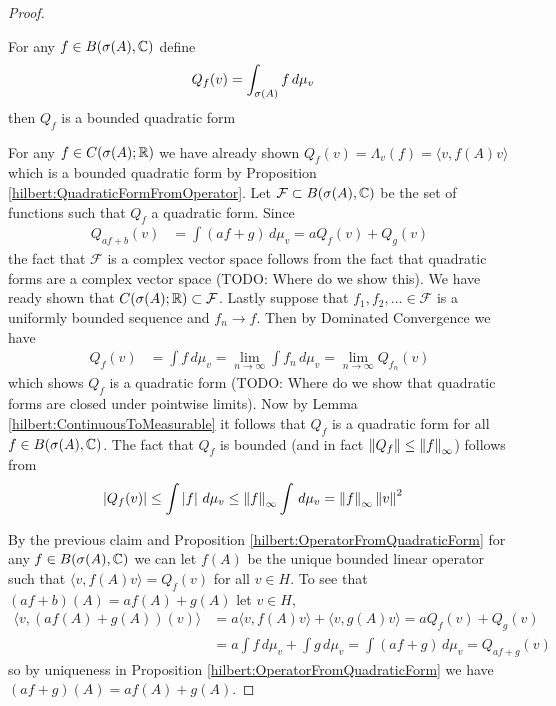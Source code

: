 \begin{proof}
\begin{clm}For any $f \in B(\sigma(A), \mathbb{C})$ define
\begin{align*}
Q_f(v) &= \int_{\sigma(A)} f \, d\mu_v
\end{align*}
then $Q_f$ is a bounded quadratic form
\end{clm}
For any $f \in C(\sigma(A); \mathbb{R})$ we have already shown $Q_f(v) = \Lambda_v(f) = \langle v, f(A) v \rangle$ which is a bounded quadratic form by Proposition \ref{hilbert:QuadraticFormFromOperator}.  Let $\mathcal{F} \subset B(\sigma(A), \mathbb{C})$ be the set of functions such that $Q_f$ a quadratic form.  Since
\begin{align*}
Q_{af +b}(v) &= \int (a f +g ) \, d\mu_v = a Q_f(v) + Q_g(v)
\end{align*}
the fact that $\mathcal{F}$ is a complex vector space follows from the fact that quadratic forms are a complex vector space (TODO: Where do we show this).  We have ready shown that $C(\sigma(A); \mathbb{R}) \subset \mathcal{F}$.  Lastly suppose that $f_1, f_2, \dotsc \in \mathcal{F}$ is a uniformly bounded sequence and $f_n \to f$.  Then by Dominated Convergence we have
\begin{align*}
Q_f(v) &= \int f \, d\mu_v = \lim_{n \to \infty} \int f_n \, d\mu_v = \lim_{n \to \infty} Q_{f_n}(v) 
\end{align*}
which shows $Q_f$ is a quadratic form (TODO: Where do we show that quadratic forms are closed under pointwise limits).  Now by Lemma \ref{hilbert:ContinuousToMeasurable} it follows that $Q_f$ is a quadratic form for all $f \in B(\sigma(A), \mathbb{C})$.  The fact that $Q_f$ is bounded (and in fact $\left \lVert Q_f \right \rVert \leq \left \lVert f \right \rVert_\infty$) follows from
\begin{align*}
\left \vert Q_f(v) \right \vert &\leq \int \left \vert f \right \vert \, d\mu_v \leq \left \lVert f \right \rVert_\infty \int \, d\mu_v = \left \lVert f \right \rVert_\infty \left \lVert v \right \rVert^2
\end{align*}

By the previous claim and Proposition \ref{hilbert:OperatorFromQuadraticForm} for any $f \in B(\sigma(A), \mathbb{C})$ we can let $f(A)$ be the unique bounded linear operator such that $\langle v , f(A) v \rangle = Q_f(v)$ for all $v \in H$.
To see that $(af + b)(A) = af(A) + g(A)$ let $v \in H$,
\begin{align*}
\langle v, (af(A) + g(A))(v) \rangle &= a \langle v, f(A) v \rangle + \langle v, g(A) v \rangle = a Q_f(v) + Q_g(v) \\
&= a \int f \, d\mu_v + \int g \, d\mu_v = \int (af + g) \, d\mu_v = Q_{af +g}(v)
\end{align*}
so by uniqueness in Proposition \ref{hilbert:OperatorFromQuadraticForm} we have $(af+g)(A) = af(A) + g(A)$.


\end{proof}
